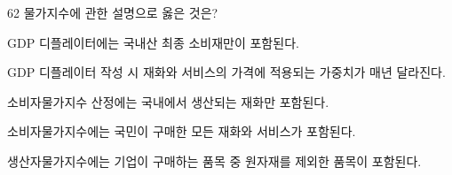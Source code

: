 \begin{question}{62}
물가지수에 관한 설명으로 옳은 것은?
\begin{choices}
  \item GDP 디플레이터에는 국내산 최종 소비재만이 포함된다.
  \item GDP 디플레이터 작성 시 재화와 서비스의 가격에 적용되는 가중치가 매년 달라진다.
  \item 소비자물가지수 산정에는 국내에서 생산되는 재화만 포함된다.
  \item 소비자물가지수에는 국민이 구매한 모든 재화와 서비스가 포함된다.
  \item 생산자물가지수에는 기업이 구매하는 품목 중 원자재를 제외한 품목이 포함된다.
\end{choices}
\end{question}
